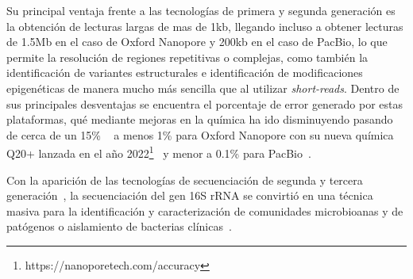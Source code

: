 Su principal ventaja frente a las tecnologías de primera y segunda generación es la obtención de lecturas largas de mas de 1kb, llegando incluso a obtener lecturas de 1.5Mb en el caso de Oxford Nanopore y 200kb en el caso de PacBio, lo que permite la resolución de regiones repetitivas o complejas, como también la identificación de variantes estructurales e identificación de modificaciones epigenéticas de manera mucho más sencilla que al utilizar \textit{short-reads}. 
Dentro de sus principales desventajas se encuentra el porcentaje de error generado por estas plataformas, qué mediante mejoras en la química ha ido disminuyendo pasando de cerca de un 15\% ~\cite{deamer2016three} a menos 1\% para Oxford Nanopore con su nueva química Q20+ lanzada en el año 2022\footnote{https://nanoporetech.com/accuracy}~\cite{cuber2023comparing} y menor a 0.1\% para PacBio~\cite{cuber2023comparing}.


Con la aparición de las tecnologías de secuenciación de segunda y tercera generación~\cite{janda200716s,pollock2018madness}, la secuenciación del gen 16S rRNA se convirtió en  una técnica masiva para la identificación y caracterización de comunidades microbioanas y de patógenos o aislamiento de bacterias clínicas~\cite{patel200116s}.






